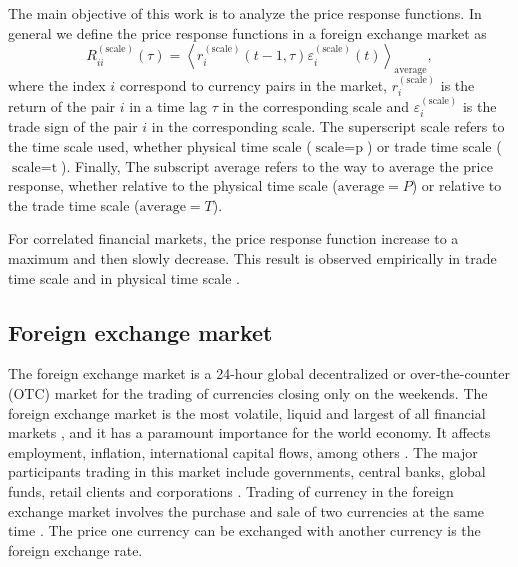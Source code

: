The main objective of this work is to analyze the price response functions. In
general we define the price response functions in a foreign exchange market as
\begin{equation}\label{eq:response_general}
    R^{\left(\textrm{scale}\right)}_{ii}\left(\tau\right)=\left\langle
    r^{\left(\textrm{scale}\right)}_{i}\left(t-1, \tau\right)
    \varepsilon^{\left(\textrm{scale}\right)}_{i} \left(t\right)\right\rangle
    _{\textrm{average}},
\end{equation}
where the index $i$ correspond to currency pairs in the market,
$r^{\left(\textrm{scale}\right)}_{i}$ is the return of the pair $i$ in a time
lag $\tau$ in the corresponding scale and
$\varepsilon^{\left(\textrm{scale}\right)}_{i}$ is the trade sign of the pair
$i$ in the corresponding scale. The superscript scale refers to the time scale
used, whether physical time scale ($\textrm{scale} = \textrm{p}$) or trade time
scale ($\textrm{scale} = \textrm{t}$). Finally, The subscript average refers to
the way to average the price response, whether relative to the physical time
scale ($\textrm{average} = P$) or relative to the trade time scale
($\textrm{average} = T$).

For correlated financial markets, the price response function increase to a
maximum and then slowly decrease. This result is observed empirically in trade
time scale and in physical time scale
\cite{my_paper_response_financial,Wang_2016_avg}.

\subsection{Foreign exchange market}\label{subsec:forex_market}

The foreign exchange market is a 24-hour global decentralized or
over-the-counter (OTC) market for the trading of currencies closing only on the
weekends.
The foreign exchange market is the most volatile, liquid and largest of all
financial markets
\cite{forex_liquidity,info_forex,forex_market_micro,forex_structure,teach_spread,intraday_forex,book_forex,book_forex_2,book_forex_3},
and it has a paramount importance for the world economy. It affects employment,
inflation, international capital flows, among others \cite{forex_structure}.
The major participants trading in this market include governments, central
banks, global funds, retail clients and corporations
\cite{book_forex_2,book_forex_3}. Trading of currency in the foreign exchange
market involves the purchase and sale of two currencies at the same time
\cite{book_forex,book_forex_2,book_forex_3}. The price one currency can be
exchanged with another currency is the foreign exchange rate.

